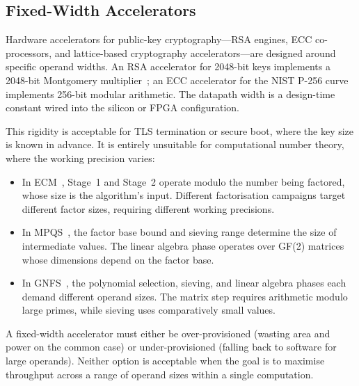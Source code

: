 \documentclass[11pt,a4paper]{article}
\begin{document}
\subsection{Fixed-Width Accelerators}
\label{sec:fixed-width}

Hardware accelerators for public-key cryptography---RSA engines, ECC
co-processors, and lattice-based cryptography accelerators---are designed
around specific operand widths.  An RSA accelerator for 2048-bit keys
implements a 2048-bit Montgomery multiplier~\cite{montgomery1985}; an
ECC accelerator for the NIST P-256 curve implements 256-bit modular
arithmetic.  The datapath width is a design-time constant wired into the
silicon or FPGA configuration.

This rigidity is acceptable for TLS termination or secure boot, where the
key size is known in advance.  It is entirely unsuitable for computational
number theory, where the working precision varies:

\begin{itemize}[leftmargin=*]
  \item In ECM~\cite{lenstra1987}, Stage~1 and Stage~2 operate modulo the
    number being factored, whose size is the algorithm's input.  Different
    factorisation campaigns target different factor sizes, requiring different
    working precisions.
  \item In MPQS~\cite{pomerance1982}, the factor base bound and sieving
    range determine the size of intermediate values.  The linear algebra
    phase operates over GF(2) matrices whose dimensions depend on the
    factor base.
  \item In GNFS~\cite{lenstra1993gnfs}, the polynomial selection, sieving,
    and linear algebra phases each demand different operand sizes.  The
    matrix step requires arithmetic modulo large primes, while sieving
    uses comparatively small values.
\end{itemize}

A fixed-width accelerator must either be over-provisioned (wasting area and
power on the common case) or under-provisioned (falling back to software for
large operands).  Neither option is acceptable when the goal is to maximise
throughput across a range of operand sizes within a single computation.

\end{document}
